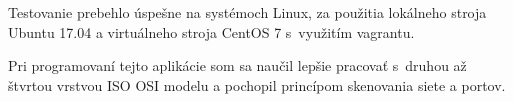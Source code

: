 Testovanie prebehlo úspešne na systémoch Linux, za použitia lokálneho stroja Ubuntu 17.04 a virtuálneho stroja CentOS 7 s~využitím vagrantu.

Pri programovaní tejto aplikácie som sa naučil lepšie pracovať s~druhou až štvrtou vrstvou ISO OSI modelu a pochopil princípom skenovania siete a portov.

